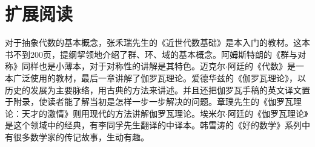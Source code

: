 \documentclass[b5paper]{ctexart}
\begin{document}
\begin{Exercise}
\end{Exercise}

\section{扩展阅读}

对于抽象代数的基本概念，张禾瑞先生的《近世代数基础》\cite{ZhangHeRui1978}是本入门的教材。这本书不到200页，提纲挈领地介绍了群、环、域的基本概念。阿姆斯特朗的《群与对称》\cite{Armstrong1988}同样也是小薄本，对于对称性的讲解是其特色。迈克尔$\cdot$阿廷的《代数》是一本广泛使用的教材，最后一章讲解了伽罗瓦理论。爱德华兹的《伽罗瓦理论》，以历史的发展为主要脉络，用古典的方法来讲述。并且还把伽罗瓦手稿的英文译文置于附录，使读者能了解当初是怎样一步一步解决的问题。章璞先生的《伽罗瓦理论：天才的激情》\cite{ZhangPu2013}则用现代的方法讲解伽罗瓦理论。埃米尔$\cdot$阿廷的《伽罗瓦理论》是这个领域中的经典，有李同孚先生翻译的中译本。韩雪涛的《好的数学》系列中有很多数学家的传记故事，生动有趣。
\end{document}
